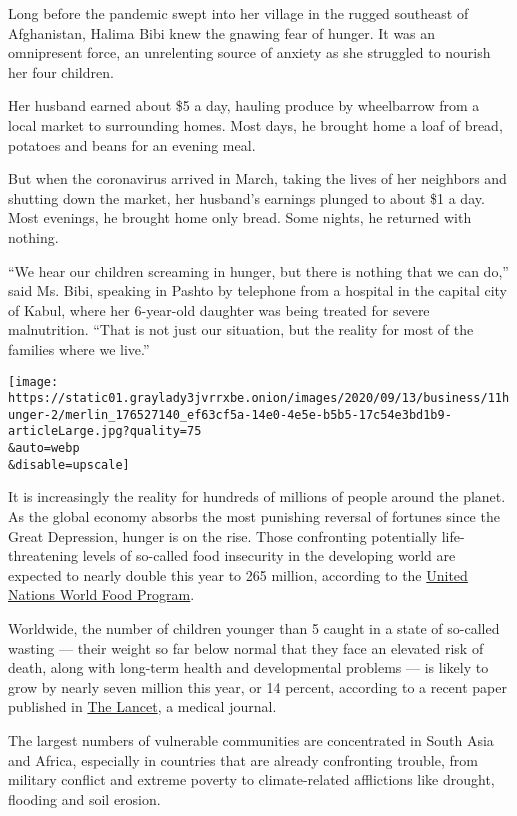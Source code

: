 Long before the pandemic swept into her village in the rugged southeast
of Afghanistan, Halima Bibi knew the gnawing fear of hunger. It was an
omnipresent force, an unrelenting source of anxiety as she struggled to
nourish her four children.

Her husband earned about \$5 a day, hauling produce by wheelbarrow from
a local market to surrounding homes. Most days, he brought home a loaf
of bread, potatoes and beans for an evening meal.

But when the coronavirus arrived in March, taking the lives of her
neighbors and shutting down the market, her husband's earnings plunged
to about \$1 a day. Most evenings, he brought home only bread. Some
nights, he returned with nothing.

``We hear our children screaming in hunger, but there is nothing that we
can do,'' said Ms. Bibi, speaking in Pashto by telephone from a hospital
in the capital city of Kabul, where her 6-year-old daughter was being
treated for severe malnutrition. ``That is not just our situation, but
the reality for most of the families where we live.''

\texttt{[image: https://static01.graylady3jvrrxbe.onion/images/2020/09/13/business/11hunger-2/merlin\_176527140\_ef63cf5a-14e0-4e5e-b5b5-17c54e3bd1b9-articleLarge.jpg?quality=75\\\&auto=webp\\\&disable=upscale]}

It is increasingly the reality for hundreds of millions of people around
the planet. As the global economy absorbs the most punishing reversal of
fortunes since the Great Depression, hunger is on the rise. Those
confronting potentially life-threatening levels of so-called food
insecurity in the developing world are expected to nearly double this
year to 265 million, according to the
\href{https://www.wfp.org/news/covid-19-will-double-number-people-facing-food-crises-unless-swift-action-taken}{United
Nations World Food Program}.

Worldwide, the number of children younger than 5 caught in a state of
so-called wasting --- their weight so far below normal that they face an
elevated risk of death, along with long-term health and developmental
problems --- is likely to grow by nearly seven million this year, or 14
percent, according to a recent paper published in
\href{https://www.thelancet.com/journals/lancet/article/PIIS0140-6736(20)31647-0/fulltext}{The
Lancet}, a medical journal.

The largest numbers of vulnerable communities are concentrated in South
Asia and Africa, especially in countries that are already confronting
trouble, from military conflict and extreme poverty to climate-related
afflictions like drought, flooding and soil erosion.

